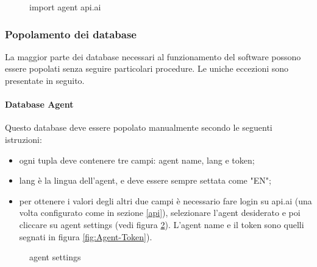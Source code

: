 \begin{figure}[h]
	\caption{import agent api.ai}\label{fig:importAgent}
\end{figure}

\subsubsection{Popolamento dei database}
La maggior parte dei database necessari al funzionamento del software possono essere popolati senza seguire particolari procedure. Le uniche eccezioni sono presentate in seguito.

\paragraph{Database Agent}
Questo database deve essere popolato manualmente secondo le seguenti istruzioni:
\begin{itemize}
\item ogni tupla deve contenere tre campi: agent name, lang e token;
\item lang è la lingua dell'agent, e deve essere sempre settata come "EN";
\item per ottenere i valori degli altri due campi è necessario fare login su api.ai (una volta configurato come in sezione \ref{api}), selezionare l'agent desiderato e poi cliccare su agent settings (vedi figura \ref{fig:Agent-Settings}). L'agent name e il token sono quelli segnati in figura \ref{fig:Agent-Token}).
\end{itemize}
\begin{figure}[h]
	\caption{agent settings}\label{fig:Agent-Settings}
\end{figure}

